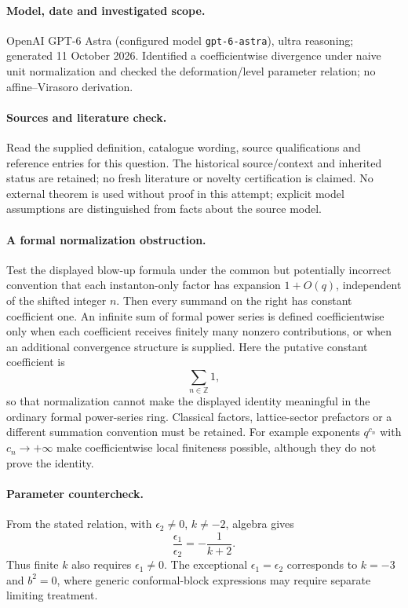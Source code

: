 \documentclass[11pt]{article}
\begin{document}
\paragraph{Model, date and investigated scope.}
OpenAI GPT-6 Astra (configured model \texttt{gpt-6-astra}), ultra reasoning; generated 11 October 2026. Identified a coefficientwise divergence under naive unit normalization and checked the deformation/level parameter relation; no affine–Virasoro derivation.

\paragraph{Sources and literature check.}
Read the supplied definition, catalogue wording, source qualifications and reference entries for this question. The historical source/context and inherited status are retained; no fresh literature or novelty certification is claimed. No external theorem is used without proof in this attempt; explicit model assumptions are distinguished from facts about the source model.

\paragraph{A formal normalization obstruction.} Test the displayed blow-up formula under the common but potentially incorrect convention that each instanton-only factor has expansion \(1+O(q)\), independent of the shifted integer \(n\). Then every summand on the right has constant coefficient one. An infinite sum of formal power series is defined coefficientwise only when each coefficient receives finitely many nonzero contributions, or when an additional convergence structure is supplied. Here the putative constant coefficient is
\[
 \sum_{n\in\mathbb Z}1,
\]
so that normalization cannot make the displayed identity meaningful in the ordinary formal power-series ring. Classical factors, lattice-sector prefactors or a different summation convention must be retained. For example exponents \(q^{c_n}\) with \(c_n\to+\infty\) make coefficientwise local finiteness possible, although they do not prove the identity.
\paragraph{Parameter countercheck.} From the stated relation, with \(\epsilon_2\ne0\), \(k\ne-2\), algebra gives
\[
 \frac{\epsilon_1}{\epsilon_2}=-\frac1{k+2}.
\]
Thus finite \(k\) also requires \(\epsilon_1\ne0\). The exceptional \(\epsilon_1=\epsilon_2\) corresponds to \(k=-3\) and \(b^2=0\), where generic conformal-block expressions may require separate limiting treatment.
\end{document}
